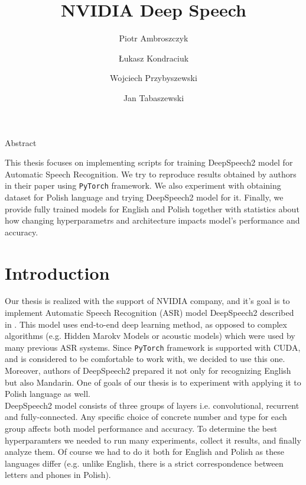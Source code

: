 \documentclass[11pt,a4paper]{article}
\title{NVIDIA Deep Speech}
\author{Piotr Ambroszczyk
\and Łukasz Kondraciuk
\and Wojciech Przybyszewski
\and Jan Tabaszewski}
\date{}
\begin{document}
\begin{titlingpage}
\maketitle
\end{titlingpage}

\begin{center}
Abstract
\end{center}
This thesis focuses on implementing scripts for training DeepSpeech2 model for Automatic Speech Recognition. We try to reproduce results obtained by authors in their paper using \texttt{PyTorch} framework. We also experiment with obtaining dataset for Polish language and trying DeepSpeech2 model for it. Finally, we provide fully trained models for English and Polish together with statistics about how changing hyperparametrs and architecture impacts model's performance and accuracy.
\newpage

\tableofcontents
\newpage

\section{Introduction}

Our thesis is realized with the support of NVIDIA company, and it's goal is to implement Automatic Speech Recognition (ASR) model DeepSpeech2 described in \cite{DS2}. This model uses end-to-end deep learning method, as opposed to complex algorithms (e.g. Hidden Marokv Models or acoustic models) which were used by many previous ASR systems. Since \texttt{PyTorch} framework is supported with CUDA, and is considered to be comfortable to work with, we decided to use this one. Moreover, authors of DeepSpeech2 prepared it not only for recognizing English but also Mandarin. One of goals of our thesis is to experiment with applying it to Polish language as well.\\

DeepSpeech2 model consists of three groups of layers i.e. convolutional, recurrent and fully-connected. Any specific choice of concrete number and type for each group affects both model performance and accuracy. To determine the best hyperparamters  we needed to run many experiments, collect it results, and finally analyze them. Of course we had to do it both for English and Polish as these languages differ (e.g. unlike English, there is a strict correspondence between letters and phones in Polish).\\
\end{document}

